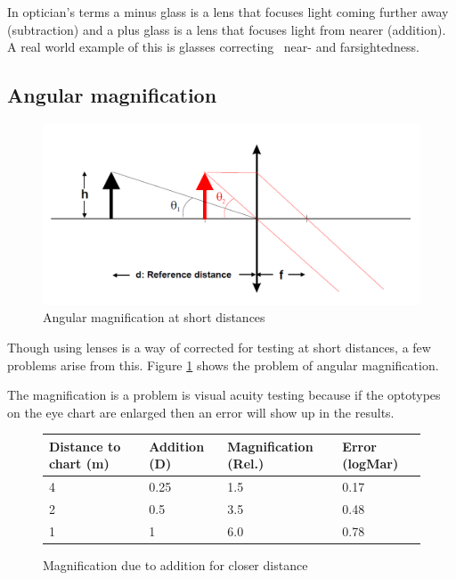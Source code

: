 \documentclass[12pt,a4paper,notitlepage]{report}
\begin{document}
In optician's terms a minus glass is a lens that focuses light coming further away (subtraction) and a plus glass is a lens that focuses light from nearer (addition). A real world example of this is glasses correcting ~near- and farsightedness.

\subsection{Angular magnification}
\begin{figure}[h]
\centering
\includegraphics[width=120mm]{images/Angular_magnification.png}
\caption{Angular magnification at short distances\label{angular}}
\end{figure}

Though using lenses is a way of corrected for testing at short distances, a few problems arise from this. Figure \ref{angular} shows the problem of angular magnification. 

The magnification is a problem is visual acuity testing because if the optotypes on the eye chart are enlarged then an error will show up in the results.

\newpage
\begin{figure}[h]
\centering
\begin{tabular}{| l | l | l | l |}
    \hline
    Distance to chart (m) & Addition (D) & Magnification (Rel.) & Error (logMar) \\ \hline
    4                     & 0.25         & 1.5                  & 0.17           \\ \hline
    2                     & 0.5          & 3.5                  & 0.48           \\ \hline
    1                     & 1            & 6.0                  & 0.78           \\ 
    \hline
    \end{tabular}
    \caption{Magnification due to addition for closer distance\label{magtable}}
\end{figure}
\end{document}
